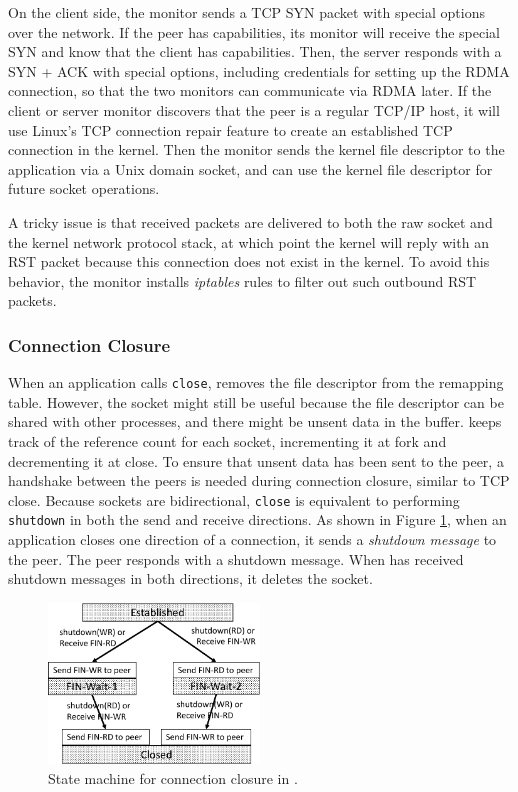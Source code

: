 On the client side, the monitor sends a TCP SYN packet with special options over the network. If the peer has \sys{} capabilities, its monitor will receive the special SYN and know that the client has \sys{} capabilities. Then, the server responds with a SYN + ACK with special options, including credentials for setting up the RDMA connection, so that the two monitors can communicate via RDMA later. If the client or server monitor discovers that the peer is a regular TCP/IP host, it will use Linux's TCP connection repair feature \cite{tcp-connection-repair} to create an established TCP connection in the kernel. Then the monitor sends the kernel file descriptor to the application via a Unix domain socket, and \libipc{} can use the kernel file descriptor for future socket operations.

A tricky issue is that received packets are delivered to both the raw socket and the kernel network protocol stack, at which point the kernel will reply with an RST packet because this connection does not exist in the kernel. To avoid this behavior, the monitor installs \emph{iptables} rules to filter out such outbound RST packets.

\subsubsection{Connection Closure}

When an application calls \texttt{close}, \libipc{} removes the file descriptor from the remapping table. However, the socket might still be useful because the file descriptor can be shared with other processes, and there might be unsent data in the buffer. \libipc{} keeps track of the reference count for each socket, incrementing it at fork and decrementing it at close. To ensure that unsent data has been sent to the peer, a handshake between the peers is needed during connection closure, similar to TCP close. Because sockets are bidirectional, \texttt{close} is equivalent to performing \texttt{shutdown} in both the send and receive directions. As shown in Figure \ref{socksdirect:fig:conn-close}, when an application closes one direction of a connection, it sends a \emph{shutdown message} to the peer. The peer responds with a shutdown message. When \libipc{} has received shutdown messages in both directions, it deletes the socket.

\begin{figure}[htbp]
	\centering
	\includegraphics[width=0.5\textwidth]{images/conn-close-new}	
	\caption{State machine for connection closure in \libipc{}.}
	\label{socksdirect:fig:conn-close}
\end{figure}

